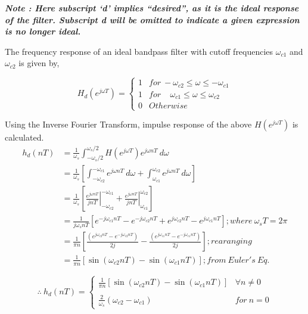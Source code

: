 \documentclass[a4paper,11pt]{article}%
\begin{document}
\textbf{\textit{Note : Here subscript `d' implies ``desired'', as it is the ideal response of the filter. Subscript d will be omitted to indicate a given expression is no longer ideal.\\}}

The frequency response of an ideal bandpass filter with cutoff frequencies $\omega_{c1}$ and $\omega_{c2}$ is given by,

\[
H_d(e^{j\omega T}) = \begin{cases}
1& for~ -\omega_{c2} \le \omega \le -\omega_{c1}\\
1& for ~~~~~\omega_{c1} \le \omega \le \omega_{c2}\\
0& Otherwise
\end{cases}
\]

Using the Inverse Fourier Transform, impulse response of the above $H(e^{j\omega T})$ is calculated.
\[
\begin{split}
	h_d(nT) &=\frac{1}{\omega_s}\int_{-\omega_s/2}^{\omega_s/2} H(e^{j\omega T})e^{j\omega nT}~d\omega\\
	&=\frac{1}{\omega_s}\left[\int_{-\omega_{c2}}^{-\omega_{c1}} e^{j\omega nT} ~d\omega+ \int_{\omega_{c1}}^{\omega_{c2}} e^{j\omega nT}~ d\omega\right]\\
	&=\frac{1}{\omega_s} \left[ \left.\frac{e^{j\omega nT}}{jn T}\right|_{-\omega_{c2}}^{-\omega_{c1}} + \left.\frac{e^{j\omega nT}}{jn T}\right|_{\omega_{c1}}^{\omega_{c2}} \right]\\
	&= \frac{1}{j\omega_s nT} \left[  e^{-j\omega_{c1}nT} - e^{-j\omega_{c2}nT}  +  e^{j\omega_{c2}nT} - e^{j\omega_{c1}nT}  \right] ; where~\omega_sT = 2\pi\\
	&= \frac{1}{\pi n}\left[ \frac{(e^{j\omega_{c2}nT} - e^{-j\omega_{c2}nT})}{2j} - \frac{(e^{j\omega_{c1}nT} - e^{-j\omega_{c1}nT})}{2j}  \right] ; rearanging\\
	&=	\frac{1}{\pi n}\left[   \sin(\omega_{c2}nT) - \sin(\omega_{c1}nT)  \right]; from~ Euler's ~Eq.
\end{split}
\]

\begin{equation}
	\therefore ~ h_d(nT) = \begin{cases}
		\frac{1}{\pi n}\left[   \sin(\omega_{c2}nT) - \sin(\omega_{c1}nT)  \right] & \forall n \ne 0\\
		&\\
		\frac{2}{\omega_s}\left( \omega_{c2} - \omega_{c1}\right)& for~ n = 0
	\end{cases}
\label{idealresponse}
\end{equation}
\end{document}
